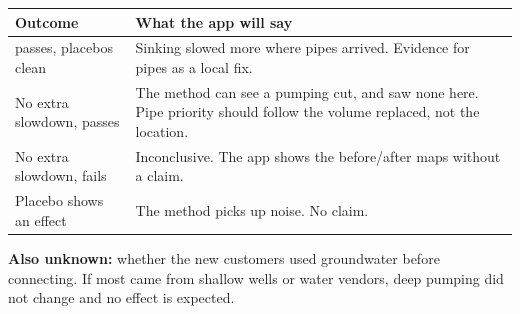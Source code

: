 \begin{center}
\small
\begin{tabularx}{\linewidth}{@{}L{52mm}Y@{}}
\toprule
\textbf{Outcome} & \textbf{What the app will say}\\
\midrule
{} passes, placebos clean & Sinking slowed more where pipes arrived. Evidence for pipes as a local fix. \\
No extra slowdown,  passes & The method can see a pumping cut, and saw none here. Pipe priority should follow the volume replaced, not the location.\\
No extra slowdown,  fails & Inconclusive. The app shows the before/after maps without a claim.\\
Placebo shows an effect & The method picks up noise. No claim.\\
\bottomrule
\end{tabularx}
\end{center}

\textbf{Also unknown:} whether the new customers used groundwater before connecting. If most came from
shallow wells or water vendors, deep pumping did not change and no effect is expected.
